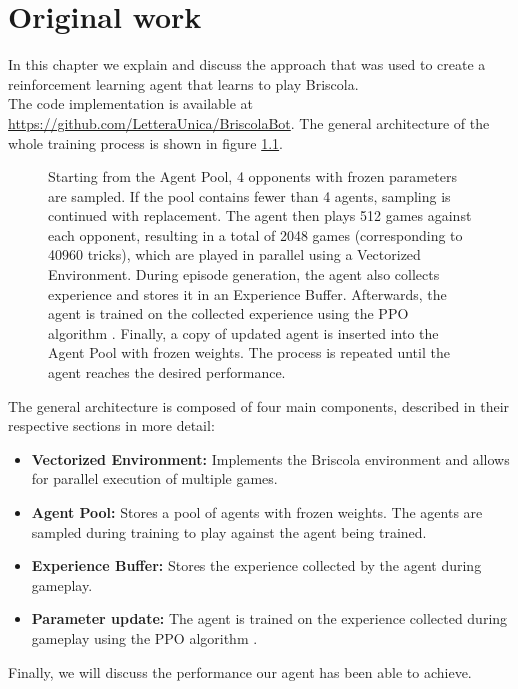 \chapter{Original work}

In this chapter we explain and discuss the approach that was used to create a reinforcement learning agent that learns to play Briscola.\\
The code implementation is available at \url{https://github.com/LetteraUnica/BriscolaBot}.
The general architecture of the whole training process is shown in figure \ref{fig:general-architecture}.

\begin{figure}[H]
    \centering
    
    \caption{Starting from the Agent Pool, 4 opponents with frozen parameters are sampled. If the pool contains fewer than 4 agents, sampling is continued with replacement. The agent then plays 512 games against each opponent, resulting in a total of 2048 games (corresponding to 40960 tricks), which are played in parallel using a Vectorized Environment. During episode generation, the agent also collects experience and stores it in an Experience Buffer. Afterwards, the agent is trained on the collected experience using the PPO algorithm \cite{schulman2017proximal}. Finally, a copy of updated agent is inserted into the Agent Pool with frozen weights. The process is repeated until the agent reaches the desired performance.}
    \label{fig:general-architecture}
\end{figure}
The general architecture is composed of four main components, described in their respective sections in more detail:
\begin{itemize}
    \item \textbf{Vectorized Environment:} Implements the Briscola environment and allows for parallel execution of multiple games.
    \item \textbf{Agent Pool:} Stores a pool of agents with frozen weights. The agents are sampled during training to play against the agent being trained.
    \item \textbf{Experience Buffer:} Stores the experience collected by the agent during gameplay.
    \item \textbf{Parameter update:} The agent is trained on the experience collected during gameplay using the PPO algorithm \cite{schulman2017proximal}.
\end{itemize}

Finally, we will discuss the performance our agent has been able to achieve.

